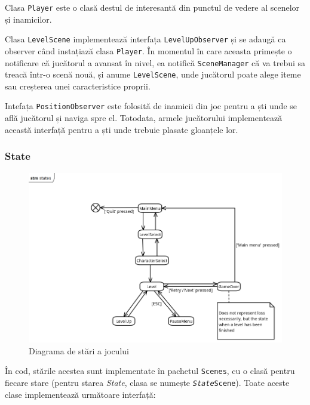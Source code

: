 \documentclass{article}
\begin{document}
    Clasa \texttt{Player} este o clasă destul de interesantă din punctul de vedere al scenelor și
    inamicilor.

    Clasa \texttt{LevelScene} implementează interfața \texttt{LevelUpObserver} și se adaugă ca
    observer când instațiază clasa \texttt{Player}. În momentul în care aceasta primește o notificare
    că jucătorul a avansat în nivel, ea notifică \texttt{SceneManager} că va trebui sa treacă într-o
    scenă nouă, și anume \texttt{LevelScene}, unde jucătorul poate alege iteme sau creșterea unei
    caracteristice proprii.

    Intefața \texttt{PositionObserver} este folosită de inamicii din joc pentru a ști unde se află
    jucătorul și naviga spre el. Totodata, armele jucătorului implementează această interfață pentru
    a ști unde trebuie plasate gloanțele lor.

    \subsubsection{State}

    \begin{figure}[H]
        \includegraphics[width=\textwidth]{state-diagram}
        \centering
        \caption{Diagrama de stări a jocului}
    \end{figure}

    În cod, stările acestea sunt implementate în pachetul \texttt{Scenes}, cu o clasă pentru fiecare
    stare (pentru starea \emph{State}, clasa se numește \texttt{\emph{State}Scene}). Toate aceste
    clase implementează următoare interfață:

    \inputminted[linenos, breaklines]{java}{Scene.java}
\end{document}
